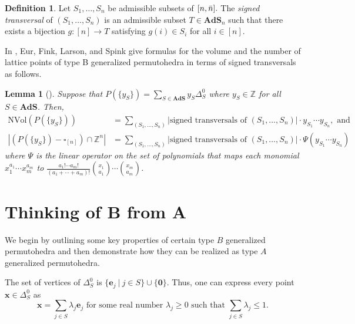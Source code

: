 \documentclass[12pt,reqno]{article}%
\newtheorem{lem}[thm]{Lemma}
\theoremstyle{definition}
\newtheorem{defn}[thm]{Definition}
\numberwithin{equation}{section}
\newcommand{\nvol}{\mathrm{NVol}}
\newcommand{\bbe}{\mathbf{e}}
\newcommand{\bbx}{\mathbf{x}}
\newcommand{\Z}{\mathbb Z}
\newcommand{\ads}{\mathbf{AdS}}
\newcommand{\sym}{\Delta^0}
\begin{document}
\begin{defn}\label{def: sign-transversals} Let $S_1, \dots, S_n$ be admissible subsets of $[n,\Bar{n}].$ The \emph{signed transversal} of $(S_1, \dots, S_n)$ is an admissible subset $T \in \ads_n$ such that there exists a bijection $g:[n] \longrightarrow T$ satisfying $g(i) \in S_i$ for all $i \in [n].$
\end{defn}

In \cite{Euretall2024}, Eur, Fink, Larson, and Spink give formulas for the volume and the number of lattice points of type B generalized permutohedra in terms of signed transversals as follows.

\begin{lem}[\cite{Euretall2024}]\label{lem: typeB-Vol-Ehrhart} Suppose that $P(\{y_S\}) = \sum_{S \in \ads} y_S\Delta^0_S$ where $y_S \in \Z$ for all $S \in \ads$. Then, 
    \begin{align}
    \nvol(P(\{y_S\})) &= \sum_{(S_1, \dots, S_n)}|\text{signed transversals of } (S_1, \dots, S_n)|\cdot y_{S_1}\cdots y_{S_n}, \text{ and }\nonumber\\
    \label{eq: typeB-Ehrhart-Eur}
        |(P(\{y_S\})-\square_{[n]})\cap \Z^n| &= \sum_{(S_1, \dots, S_n)}|\text{signed transversals of } (S_1, \dots, S_n)|\cdot \Psi\left(y_{S_1}\cdots y_{S_n} \right) 
    \end{align}
    where $\Psi$ is the linear operator on the set of polynomials that maps each monomial $x^{a_1}_1\cdots x^{a_m}_m$ to $\frac{a_1!\cdots a_m!}{(a_1 + \cdots + a_m)!}\binom{x_1}{a_1}\cdots \binom{x_m}{a_m}$.
\end{lem}

\section{Thinking of B from A}

We begin by outlining some key properties of certain type $B$ generalized permutohedra and then demonstrate how they can be realized as type $A$ generalized permutohedra.

The set of vertices of $\sym_S$ is $\{\bbe_j\ | \ j \in S\}\cup \{\mathbf{0}\}$. Thus, one can express every point $\bbx \in \sym_S$ as
    \begin{equation}\label{eq: point_in_Delta_S}
        \bbx = \sum_{j \in S}\lambda_j \bbe_j \text{ for some real number }  \lambda_j \geq 0 \text{ such that } \sum_{j \in S}\lambda_j \leq 1.
    \end{equation}
\end{document}
